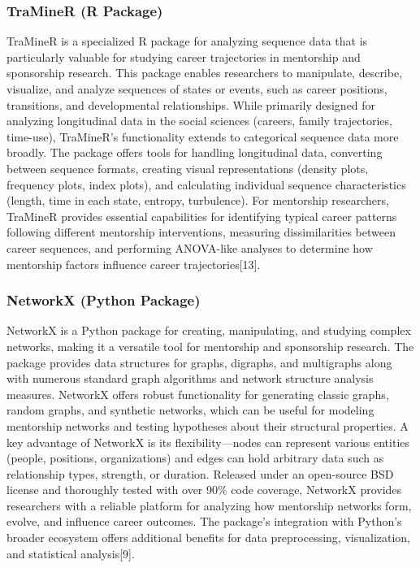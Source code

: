 \documentclass[
  letterpaper,
  DIV=11,
  numbers=noendperiod]{scrartcl}
\begin{document}
\subsubsection{TraMineR (R Package)}\label{traminer-r-package}

TraMineR is a specialized R package for analyzing sequence data that is
particularly valuable for studying career trajectories in mentorship and
sponsorship research. This package enables researchers to manipulate,
describe, visualize, and analyze sequences of states or events, such as
career positions, transitions, and developmental relationships. While
primarily designed for analyzing longitudinal data in the social
sciences (careers, family trajectories, time-use), TraMineR's
functionality extends to categorical sequence data more broadly. The
package offers tools for handling longitudinal data, converting between
sequence formats, creating visual representations (density plots,
frequency plots, index plots), and calculating individual sequence
characteristics (length, time in each state, entropy, turbulence). For
mentorship researchers, TraMineR provides essential capabilities for
identifying typical career patterns following different mentorship
interventions, measuring dissimilarities between career sequences, and
performing ANOVA-like analyses to determine how mentorship factors
influence career trajectories{[}13{]}.

\subsubsection{NetworkX (Python Package)}\label{networkx-python-package}

NetworkX is a Python package for creating, manipulating, and studying
complex networks, making it a versatile tool for mentorship and
sponsorship research. The package provides data structures for graphs,
digraphs, and multigraphs along with numerous standard graph algorithms
and network structure analysis measures. NetworkX offers robust
functionality for generating classic graphs, random graphs, and
synthetic networks, which can be useful for modeling mentorship networks
and testing hypotheses about their structural properties. A key
advantage of NetworkX is its flexibility---nodes can represent various
entities (people, positions, organizations) and edges can hold arbitrary
data such as relationship types, strength, or duration. Released under
an open-source BSD license and thoroughly tested with over 90\% code
coverage, NetworkX provides researchers with a reliable platform for
analyzing how mentorship networks form, evolve, and influence career
outcomes. The package's integration with Python's broader ecosystem
offers additional benefits for data preprocessing, visualization, and
statistical analysis{[}9{]}.
\end{document}
